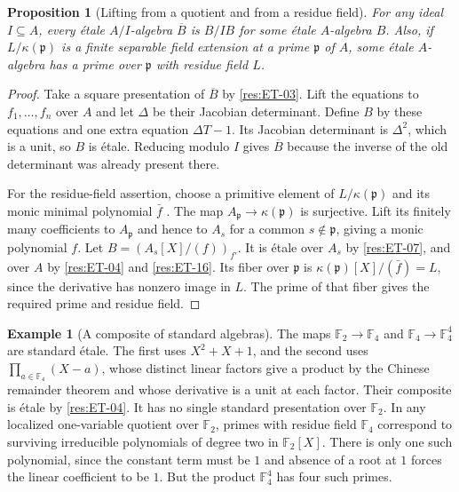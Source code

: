 \documentclass[11pt,oneside,openany]{book}
\newtheorem{proposition}[theorem]{Proposition}
\theoremstyle{definition}
\newtheorem{example}[theorem]{Example}
\theoremstyle{remark}
\begin{document}
\begin{proposition}[Lifting from a quotient and from a residue field]
\label{res:ET-19}
For any ideal $I\subseteq A$, every \'{e}tale $A/I$-algebra
$\overline B$ is $B/IB$ for some \'{e}tale $A$-algebra $B$.
Also, if $L/\kappa(\mathfrak p)$ is a finite separable field
extension at a prime $\mathfrak p$ of $A$, some \'{e}tale
$A$-algebra has a prime over $\mathfrak p$ with residue field $L$.
\end{proposition}
\begin{proof}
Take a square presentation of $\overline B$ by \ref{res:ET-03}.
Lift the equations to $f_1,\ldots,f_n$ over $A$ and let $\Delta$
be their Jacobian determinant. Define $B$ by these equations and
one extra equation $\Delta T-1$. Its Jacobian determinant is
$\Delta^2$, which is a unit, so $B$ is \'{e}tale. Reducing modulo
$I$ gives $\overline B$ because the inverse of the old determinant
was already present there.

For the residue-field assertion, choose a primitive element of
$L/\kappa(\mathfrak p)$ and its monic minimal polynomial $\bar f$
\cite[Chapter 12]{d07}. The map
$A_{\mathfrak p}\to\kappa(\mathfrak p)$ is surjective. Lift its
finitely many coefficients to $A_{\mathfrak p}$ and hence to
$A_s$ for a common $s\notin\mathfrak p$, giving a monic polynomial
$f$. Let $B=(A_s[X]/(f))_{f'}$. It is \'{e}tale over $A_s$
by \ref{res:ET-07}, and over $A$ by \ref{res:ET-04} and
\ref{res:ET-16}. Its fiber over $\mathfrak p$ is
$\kappa(\mathfrak p)[X]/(\bar f)=L$, since the derivative
has nonzero image in $L$. The prime of that fiber gives the
required prime and residue field.
\end{proof}

\begin{example}[A composite of standard algebras]\label{res:ET-20}
The maps $\mathbb F_2\to\mathbb F_4$ and
$\mathbb F_4\to\mathbb F_4^4$ are standard \'{e}tale.
The first uses $X^2+X+1$, and the second uses
$\prod_{a\in\mathbb F_4}(X-a)$, whose distinct linear factors
give a product by the Chinese remainder theorem and whose
derivative is a unit at each factor. Their composite is
\'etale by \ref{res:ET-04}. It has no single standard
presentation over $\mathbb F_2$. In any localized one-variable
quotient over $\mathbb F_2$, primes with residue field
$\mathbb F_4$ correspond to surviving irreducible polynomials
of degree two in $\mathbb F_2[X]$. There is only one such
polynomial, since the constant term must be $1$ and absence
of a root at $1$ forces the linear coefficient to be $1$.
But the product $\mathbb F_4^4$ has four such primes.
\end{example}
\end{document}
